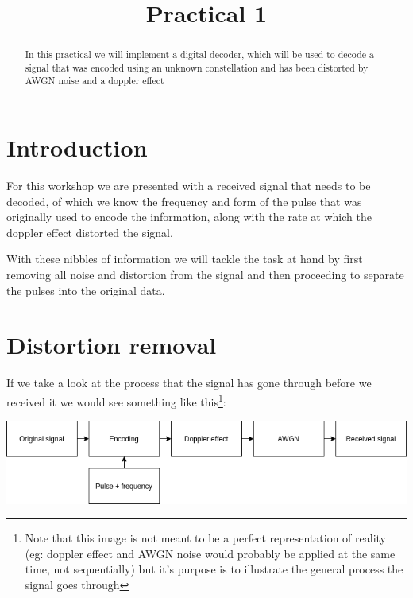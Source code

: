 \documentclass[conference,9pt]{IEEEtran}
\begin{document}
%
\title{Practical 1}

\author{
}


\maketitle
\begin{abstract}
  In this practical we will implement a digital decoder, which will be used to decode a signal that was encoded using an unknown constellation and has been distorted by AWGN noise and a doppler effect
\end{abstract}



\section{Introduction}
For this workshop we are presented with a received signal that needs to be decoded, of which we know the frequency and form of the pulse that was originally used to encode the information, along with the rate at which the doppler effect distorted the signal.

With these nibbles of information we will tackle the task at hand by first removing all noise and distortion from the signal and then proceeding to separate the pulses into the original data.

\section{Distortion removal}
If we take a look at the process that the signal has gone through before we received it we would see something like this\footnote{Note that this image is not meant to be a perfect representation of reality (eg: doppler effect and AWGN noise would probably be applied at the same time, not sequentially) but it's purpose is to illustrate the general process the signal goes through}:

\vspace{5mm}
\includegraphics[scale=0.35]{initial-process}
\vspace{5mm}
\end{document}
